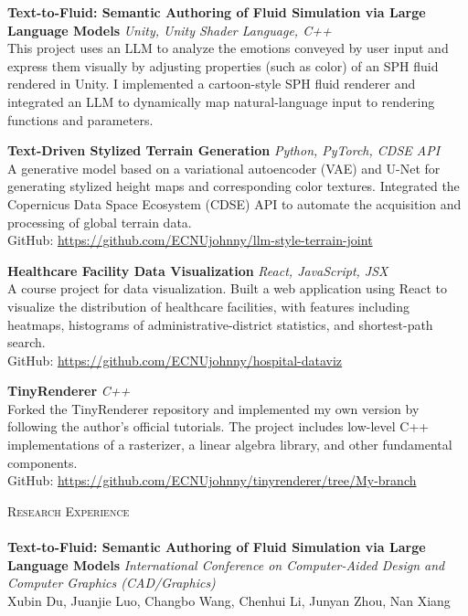 \documentclass[a4paper, 11pt]{article}
\newcommand{\lineunder} {
    \vspace*{-8pt} \\
    \hspace*{-18pt} \hrulefill \\
}
\newcommand{\header} [1] {
    {\hspace*{-18pt}\vspace*{6pt} \textsc{#1}}
    \vspace*{-6pt} \lineunder
}
\begin{document}
{\textbf{Text-to-Fluid: Semantic Authoring of Fluid Simulation via Large Language Models}} {\sl Unity, Unity Shader Language, C++} \\
This project uses an LLM to analyze the emotions conveyed by user input and express them visually by adjusting properties (such as color) of an SPH fluid rendered in Unity. I implemented a cartoon-style SPH fluid renderer and integrated an LLM to dynamically map natural-language input to rendering functions and parameters.\\
\vspace*{3mm}

{\textbf{Text-Driven Stylized Terrain Generation}} {\sl Python, PyTorch, CDSE API} \\
A generative model based on a variational autoencoder (VAE) and U-Net for generating stylized height maps and corresponding color textures. Integrated the Copernicus Data Space Ecosystem (CDSE) API to automate the acquisition and processing of global terrain data.\\
GitHub: \url{https://github.com/ECNUjohnny/llm-style-terrain-joint}\\
\vspace*{3mm}

{\textbf{Healthcare Facility Data Visualization}} {\sl React, JavaScript, JSX} \\
A course project for data visualization. Built a web application using React to visualize the distribution of healthcare facilities, with features including heatmaps, histograms of administrative-district statistics, and shortest-path search.\\
GitHub: \url{https://github.com/ECNUjohnny/hospital-dataviz}\\
\vspace*{3mm}

{\textbf{TinyRenderer}} {\sl C++} \\
Forked the TinyRenderer repository and implemented my own version by following the author's official tutorials. The project includes low-level C++ implementations of a rasterizer, a linear algebra library, and other fundamental components.\\
GitHub: \url{https://github.com/ECNUjohnny/tinyrenderer/tree/My-branch}\\
\vspace*{3mm}

\header{Research Experience}
{\textbf{Text-to-Fluid: Semantic Authoring of Fluid Simulation via Large Language Models}} {\sl International Conference on Computer-Aided Design and Computer Graphics (CAD/Graphics)} \\
Xubin Du, Juanjie Luo, Changbo Wang, Chenhui Li, Junyan Zhou, Nan Xiang\\
\vspace*{3mm}
\end{document}
